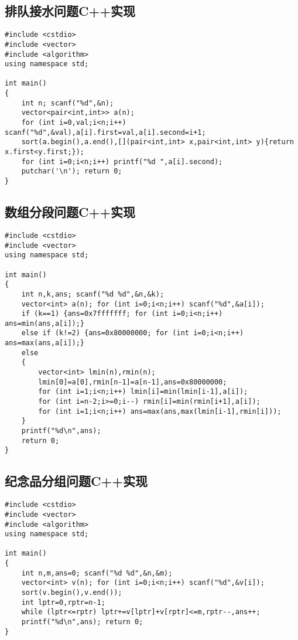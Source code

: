 \documentclass{article}
\begin{document}
\subsection{排队接水问题C++实现}

\begin{lstlisting}
#include <cstdio>
#include <vector>
#include <algorithm>
using namespace std;

int main()
{
    int n; scanf("%d",&n);
    vector<pair<int,int>> a(n);
    for (int i=0,val;i<n;i++) scanf("%d",&val),a[i].first=val,a[i].second=i+1;
    sort(a.begin(),a.end(),[](pair<int,int> x,pair<int,int> y){return x.first<y.first;});
    for (int i=0;i<n;i++) printf("%d ",a[i].second);
    putchar('\n'); return 0;
}
\end{lstlisting}

\subsection{数组分段问题C++实现}

\begin{lstlisting}
#include <cstdio>
#include <vector>
using namespace std;

int main()
{
    int n,k,ans; scanf("%d %d",&n,&k);
    vector<int> a(n); for (int i=0;i<n;i++) scanf("%d",&a[i]);
    if (k==1) {ans=0x7fffffff; for (int i=0;i<n;i++) ans=min(ans,a[i]);}
    else if (k!=2) {ans=0x80000000; for (int i=0;i<n;i++) ans=max(ans,a[i]);}
    else
    {
        vector<int> lmin(n),rmin(n);
        lmin[0]=a[0],rmin[n-1]=a[n-1],ans=0x80000000;
        for (int i=1;i<n;i++) lmin[i]=min(lmin[i-1],a[i]);
        for (int i=n-2;i>=0;i--) rmin[i]=min(rmin[i+1],a[i]);
        for (int i=1;i<n;i++) ans=max(ans,max(lmin[i-1],rmin[i]));
    }
    printf("%d\n",ans);
    return 0;
}
\end{lstlisting}

\subsection{纪念品分组问题C++实现}

\begin{lstlisting}
#include <cstdio>
#include <vector>
#include <algorithm>
using namespace std;

int main()
{
    int n,m,ans=0; scanf("%d %d",&n,&m);
    vector<int> v(n); for (int i=0;i<n;i++) scanf("%d",&v[i]);
    sort(v.begin(),v.end());
    int lptr=0,rptr=n-1;
    while (lptr<=rptr) lptr+=v[lptr]+v[rptr]<=m,rptr--,ans++;
    printf("%d\n",ans); return 0;
}
\end{lstlisting}
\end{document}
